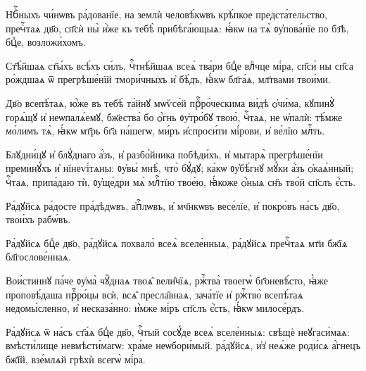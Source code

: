 
\label{bogorod8}

\hKv Нбⷭ҇ныхъ чи́нѡвъ ра́дованїе, на землѝ человѣ́кѡвъ  крѣ́пкое предста́тельство, пречⷭ҇таѧ дв҃о, сп҃сѝ ны̀ и҆̀же  къ тебѣ̀ прибѣга́ющыѧ: ꙗ҆́кѡ на тѧ̀ ᲂу҆пова́нїе по  бз҃ѣ, бцⷣе, возложи́хомъ. 
%

\hKv Ст҃ѣ́йшаѧ ст҃ы́хъ всѣ́хъ си́лъ, чⷭ҇тнѣ́йшаѧ всеѧ̀ тва́ри  бцⷣе влⷣчце мі́ра, сп҃си́ ны сп҃са  ро́ждшаѧ ѿ прегрѣше́нїй тмори́чныхъ и҆ бѣ́дъ,  ꙗ҆́кѡ бл҃га́ѧ, мл҃твами твои́ми. 
%

\hKv Дв҃о всепѣ́таѧ, ю҆́же въ тебѣ̀ та́йнꙋ мѡѷсе́й  прⷪ҇ро́ческима ви́дѣ ѻ҆чи́ма, кꙋпинꙋ̀ горѧ́щꙋ и҆  неѡпалѧ́емꙋ, бж҃ества́ бо ѻ҆́гнь ᲂу҆тро́бꙋ твою̀, чⷭ҇таѧ,  не ѡ҆палѝ: тѣ́мже мо́лимъ тѧ̀, ꙗ҆́кѡ мт҃рь бг҃а на́шегѡ,  ми́ръ и҆спроси́ти мі́рови, и҆ ве́лїю млⷭ҇ть. 
%

\hKv Блꙋдни́цꙋ и҆ блꙋ́днаго а҆́зъ, и҆ разбо́йника побѣди́хъ, и҆  мытарѧ̀ прегрѣше́нїи преминꙋ́хъ и҆ нїнеѵі́тѧны: ᲂу҆вы̀  мнѣ̀, что̀ бꙋ́дꙋ; ка́кѡ ᲂу҆бѣ́гнꙋ мꙋ́ки а҆́зъ  ѻ҆каѧ́нный; чⷭ҇таѧ, припа́даю тѝ, ᲂу҆ще́дри мѧ̀ млⷭ҇тїю  твое́ю, ꙗ҆́коже ѻ҆́ныѧ сн҃ъ тво́й сп҃слъ є҆́сть. 
%

\hKv Ра́дꙋйсѧ ра́досте пра́дѣдѡвъ, а҆пⷭ҇лѡвъ, и҆ мч҃нкѡвъ  весе́лїе, и҆ покро́въ на́съ дв҃о, твои́хъ рабѡ́въ.  
%

\hKv Ра́дꙋйсѧ бцⷣе дв҃о, ра́дꙋйсѧ похвало̀ всеѧ̀ вселе́нныѧ,  ра́дꙋйсѧ пречⷭ҇таѧ мт҃и бж҃їѧ бл҃гослове́ннаѧ. 
%

\hKv Вои́стиннꙋ па́че ᲂу҆ма̀ чꙋ̑днаѧ твоѧ̑ вели̑чїѧ, ржⷭ҇тва̀  твоегѡ̀ бг҃оневѣ́сто, ꙗ҆̀же проповѣ́даша прⷪ҇ро́цы всѝ,  всѧ̑ пресла̑внаѧ, зача́тїе и҆ ржⷭ҇тво̀ всепѣ́таѧ  недомы́сленно, и҆ несказа́нно: и҆́мже мі́ръ сп҃слъ є҆́сть,  ꙗ҆́кѡ милосе́рдъ. 
%

\hKv Ра́дꙋйсѧ ѿ на́съ ст҃а́ѧ бцⷣе дв҃о, чⷭ҇тый сосꙋ́де всеѧ̀  вселе́нныѧ: свѣщѐ неꙋгаси́маѧ: вмѣсти́лище  невмѣсти́магѡ: хра́ме неѡбори́мый. ра́дꙋйсѧ, и҆з̾ неѧ́же  роди́сѧ а҆́гнецъ бж҃їй, взе́млѧй грѣхѝ всегѡ̀ мі́ра.  
%

